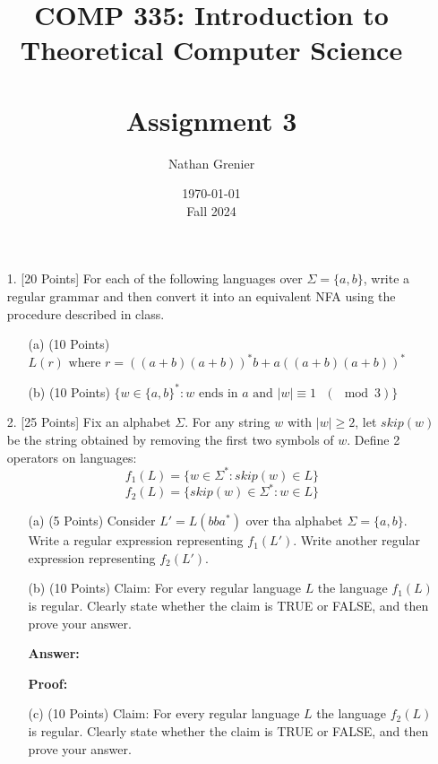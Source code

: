 \documentclass[12pt]{article}
\title{COMP 335: Introduction to Theoretical Computer Science\\
\ \\
Assignment 3}
\author{Nathan Grenier}
\date{\today \\ Fall 2024}
\begin{document}
\begin{spacing}{1.5}
      \maketitle

      \newpage

      \begin{enumerate}

            \item[1.] [20 Points] For each of the following languages over $\Sigma = \{a,b\}$, write a regular grammar and then convert it into an equivalent NFA using the procedure described in class.

                  \begin{enumerate}
                        \item[(a)] (10 Points) $L(r) \text{ where } r= ((a+b)(a+b))^*b+a((a+b)(a+b))^*$

                        \item[(b)] (10 Points) $\{w \in \{a,b\}^* : w \text{ ends in $a$ and $|w| \equiv 1$ } (\mod 3) \}$

                  \end{enumerate}

                  \newpage
            \item[2.] [25 Points] Fix an alphabet $\Sigma$. For any string $w$ with $|w| \geq 2$, let $skip(w)$ be the string obtained by removing the first two symbols of $w$. Define 2 operators on languages:
                  $$f_1(L)=\{w \in \Sigma^* : skip(w) \in L \}$$
                  $$f_2(L)=\{skip(w) \in \Sigma^* : w \in L \}$$

                  \begin{enumerate}
                        \item[(a)] (5 Points) Consider $L' = L(bba^*)$ over tha alphabet $\Sigma = \{a,b \}$. Write a regular expression representing $f_1(L')$. Write another regular expression representing $f_2(L')$.

                        \item[(b)] (10 Points) Claim: For every regular language $L$ the language $f_1(L)$ is regular. Clearly state whether the claim is TRUE or FALSE, and then prove your answer.

                              \textbf{Answer:}

                              \textbf{Proof:}

                        \item[(c)] (10 Points) Claim: For every regular language $L$ the language $f_2(L)$ is regular. Clearly state whether the claim is TRUE or FALSE, and then prove your answer.


\end{enumerate}
\end{enumerate}
\end{spacing}
\end{document}
